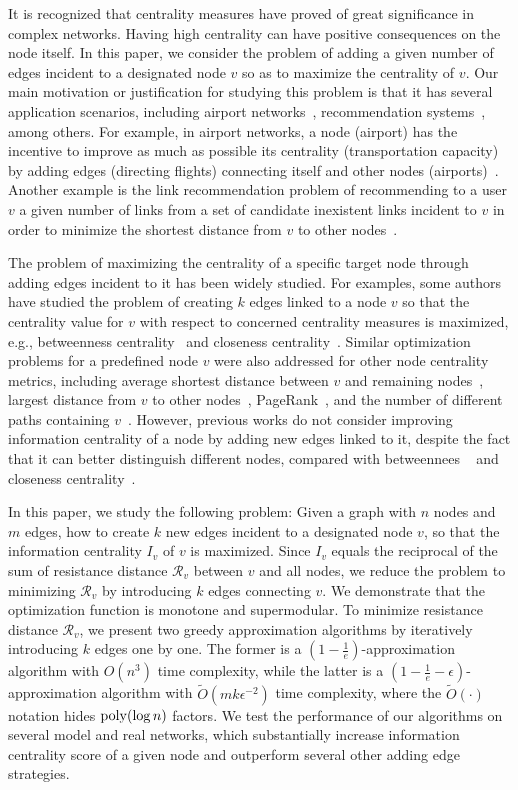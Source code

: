 \documentclass{article}
\newcommand{\eps}{\epsilon}
\newcommand\Otil{\widetilde{O}}
\begin{document}
It is recognized that centrality measures have proved of great significance in complex networks. Having high centrality can have positive consequences on the node itself. In this paper, we consider the problem of adding a given number of edges incident to a designated node $v$ so as to maximize the centrality of $v$. Our main motivation or justification for studying this problem is that it has several application scenarios, including airport networks~\cite{IsErTeBe12}, recommendation systems~\cite{PaPiTs16}, among others. For example, in airport networks, a node (airport) has the incentive to improve as much as possible its centrality (transportation capacity) by adding edges (directing flights) connecting itself and other nodes (airports)~\cite{IsErTeBe12}. Another example is the link recommendation problem of recommending to a user $v$ a given number of links from a set of candidate inexistent links incident to  $v$ in order to minimize the shortest distance from $v$ to other nodes~\cite{PaPiTs16}.

The problem of maximizing the centrality of a specific target node through adding edges incident to it has been widely studied. For examples, some authors have studied the problem of creating $k$ edges linked to a node $v$ so that the centrality value for $v$ with respect to concerned centrality measures is maximized, e.g., betweenness centrality~\cite{CrDaSeVe15,DaSeVe16,CrDaSeVe16,HoMoSo18} and closeness centrality~\cite{CrDaSeVe15,HoMoSo18}. Similar optimization problems for a predefined node $v$ were also addressed for other node centrality metrics, including average shortest distance between $v$ and remaining nodes~\cite{MeTa09,PaPiTs16}, largest distance from $v$ to other nodes~\cite{DeZa10}, PageRank~\cite{AvLi06,Os10}, and the number of different paths containing $v$~\cite{IsErTeBe12}. However, previous works do not consider improving information centrality of a node by adding new edges linked to it, despite the fact that it can better distinguish different nodes, compared with betweennees ~\cite{Ne05} and closeness centrality~\cite{BeWeLuMe16}.


In this paper, we study the following problem: Given a graph with $n$ nodes and $m$ edges, how to create $k$ new edges incident to a designated node $v$, so that the information centrality $I_v$ of $v$ is maximized. Since $I_v$ equals the reciprocal of the sum of resistance distance $\mathcal{R}_v$ between $v$ and all nodes, we reduce the problem to minimizing $\mathcal{R}_v$ by introducing $k$ edges connecting  $v$. We demonstrate that the optimization function is monotone and supermodular. To minimize resistance distance $\mathcal{R}_v$, we present two greedy approximation algorithms by iteratively introducing $k$ edges one by one. The former is a $\left(1-\frac{1}{e}\right)$-approximation algorithm with $O(n^3)$ time complexity, while the latter is a $\left(1-\frac{1}{e}-\eps\right)$-approximation algorithm with $\Otil (mk\eps^{-2})$ time complexity, where the $\Otil (\cdot)$ notation hides ${\rm poly} (\log n)$ factors. We test the performance of our algorithms on several model and real networks, which substantially increase information centrality score of a given node and outperform several other adding edge strategies.
\end{document}
